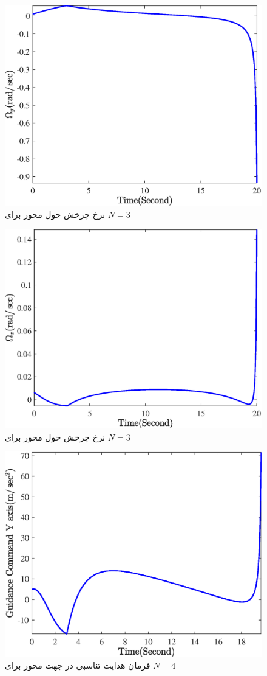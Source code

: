 \begin{figure}[H]
	\centering
	\includegraphics[width=.75\linewidth]{../Figure/Q1/b/Omega_y_3}
	\caption{ نرخ چرخش حول محور
		برای 
		$N=3$}
\end{figure}

\begin{figure}[H]
	\centering
	\includegraphics[width=.75\linewidth]{../Figure/Q1/b/Omega_z_3}
	\caption{ نرخ چرخش حول محور
		برای 
		$N=3$}
\end{figure}


\begin{figure}[H]
	\centering
	\includegraphics[width=.75\linewidth]{../Figure/Q1/b/GC_y_4}
	\caption{فرمان هدایت تناسبی در جهت محور
		برای 
		$N=4$}
\end{figure}


